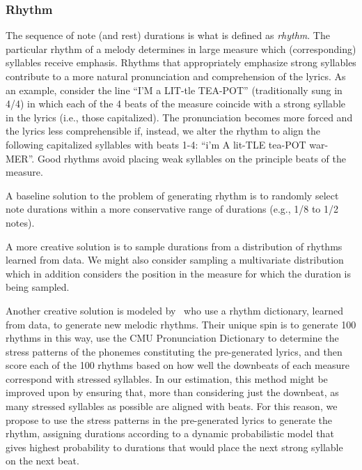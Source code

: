 \documentclass[11pt,phd]{byuprop}
\begin{document}

\subsubsection{Rhythm}

The sequence of note (and rest) durations is what is defined as \emph{rhythm}. The particular rhythm of a melody determines in large measure which (corresponding) syllables receive emphasis. Rhythms that appropriately emphasize strong syllables contribute to a more natural pronunciation and comprehension of the lyrics. As an example, consider the line ``I'M a LIT-tle TEA-POT'' (traditionally sung in 4/4) in which each of the 4 beats of the measure coincide with a strong syllable in the lyrics (i.e., those capitalized). The pronunciation becomes more forced and the lyrics less comprehensible if, instead, we alter the rhythm to align the following capitalized syllables with beats 1-4: ``i'm A lit-TLE tea-POT war-MER''. Good rhythms avoid placing weak syllables on the principle beats of the measure.

A baseline solution to the problem of generating rhythm is to randomly select note durations within a more conservative range of durations (e.g., 1/8 to 1/2 notes). 

A more creative solution is  to sample durations from a distribution of rhythms learned from data. We might also consider sampling a multivariate distribution which in addition considers the position in the measure for which the duration is being sampled.

Another creative solution is modeled by~\cite{monteith2012automatic} who use a rhythm dictionary, learned from data, to generate new melodic rhythms. Their unique spin is to generate 100 rhythms in this way, use the CMU Pronunciation Dictionary to determine the stress patterns of the phonemes constituting the pre-generated lyrics, and then score each of the 100 rhythms based on how well the downbeats of each measure correspond with stressed syllables. In our estimation, this method might be improved upon by ensuring that, more than considering just the downbeat, as many stressed syllables as possible are aligned with beats. For this reason, we propose to use the stress patterns in the pre-generated lyrics to generate the rhythm, assigning durations according to a dynamic probabilistic model that gives highest probability to durations that would place the next strong syllable on the next beat.
\end{document}
